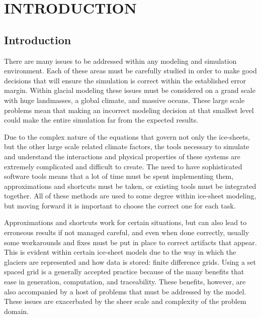 
\section{INTRODUCTION}\label{ch:intro}

\subsection{Introduction}\label{sec:chp1intro}

There are many issues to be addressed within any modeling and simulation environment.  Each of these areas must be carefully studied in order to make good decisions that will ensure the simulation is correct within the established error margin.  Within glacial modeling these issues must be considered on a grand scale with huge landmasses, a global climate, and massive oceans. These large scale problems mean that making an incorrect modeling decision at that smallest level could make the entire simulation far from the expected results.

Due to the complex nature of the equations that govern not only the ice-sheets, but the other large scale related climate factors, the tools necessary to simulate and understand the interactions and physical properties of these systems are extremely complicated and difficult to create.  The need to have sophisticated software tools means that a lot of time must be spent implementing them, approximations and shortcuts must be taken, or existing tools must be integrated together.  All of these methods are used to some degree within ice-sheet modeling, but moving forward it is important to choose the correct one for each task.

Approximations and shortcuts work for certain situations, but can also lead to erroneous results if not managed careful, and even when done correctly, usually some workarounds and fixes must be put in place to correct artifacts that appear.  This is evident within certain ice-sheet models due to the way in which the glaciers are represented and how data is stored:  finite difference grids. Using a set spaced grid is a generally accepted practice because of the many benefits that ease in generation, computation, and traceability.  These benefits, however, are also accompanied by a host of problems that must be addressed by the model.  These issues are exacerbated by the sheer scale and complexity of the problem domain.

